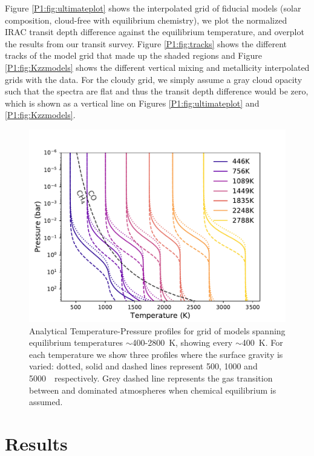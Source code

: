 Figure \ref{P1:fig:ultimateplot} shows the interpolated grid of fiducial models (solar composition, cloud-free with equilibrium chemistry), we plot the normalized IRAC transit depth difference against the equilibrium temperature, and overplot the results from our transit survey. Figure \ref{P1:fig:tracks} shows the different tracks of the model grid that made up the shaded regions and Figure \ref{P1:fig:Kzzmodels} shows the different vertical mixing and metallicity interpolated grids with the data. For the cloudy grid, we simply assume a gray cloud opacity such that the spectra are flat and thus the transit depth difference would be zero, which is shown as a vertical line on Figures \ref{P1:fig:ultimateplot} and \ref{P1:fig:Kzzmodels}.

\begin{figure}[ht]
    \centering
    \includegraphics[width=\linewidth]{TPgrid2.pdf}
    \caption{Analytical Temperature-Pressure profiles for grid of models spanning equilibrium temperatures $\sim$400-2800~K, showing every $\sim$400~K. For each temperature we show three profiles where the surface gravity is varied: dotted, solid and dashed lines represent 500, 1000 and 5000~\cmss~respectively. Grey dashed line represents the gas transition between  and  dominated atmospheres when chemical equilibrium is assumed.}
    \label{P1:fig:TPgrid}
\end{figure}


\section{Results}
\label{P1:sec:Results}

